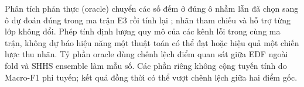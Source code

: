 Phân tích phản thực (oracle) chuyển các số đếm ở đúng ô nhầm lẫn đã chọn sang ô dự đoán đúng trong ma trận E3 rồi tính lại \mf; nhãn tham chiếu và hỗ trợ từng lớp không đổi. Phép tính định lượng quy mô của các kênh lỗi trong cùng ma trận, không dự báo hiệu năng một thuật toán có thể đạt hoặc hiệu quả một chiến lược thu nhãn. Tỷ phần oracle dùng chênh lệch điểm quan sát giữa EDF ngoài fold và SHHS ensemble làm mẫu số. Các phần riêng không cộng tuyến tính do Macro-F1 phi tuyến; kết quả đồng thời có thể vượt chênh lệch giữa hai điểm gốc.
